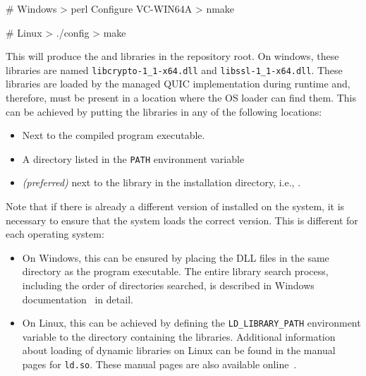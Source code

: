 \begin{myVerbatim}
# Windows
> perl Configure VC-WIN64A
> nmake

# Linux
> ./config
> make
\end{myVerbatim}

This will produce the  and  libraries in the \libopenssl{}
repository root. On windows, these libraries are named \texttt{libcrypto-1_1-x64.dll} and
\texttt{libssl-1_1-x64.dll}. These libraries are loaded by the managed QUIC implementation during
runtime and, therefore, must be present in a location where the OS loader can find them. This can be
achieved by putting the libraries in any of the following locations:

\begin{itemize}

  \item Next to the compiled program executable.

  \item A directory listed in the \texttt{PATH} environment variable

  \item \textit{(preferred)} next to the \SystemNetQuicDll{} library in the \dotnet{} installation
directory, i.e., .

\end{itemize}

Note that if there is already a different version of \libopenssl{} installed on the system, it is
necessary to ensure that the system loads the correct \libopenssl{} version. This is different for
each operating system:

\begin{itemize}

  \item On Windows, this can be ensured by placing the DLL files in the same directory as the
program executable. The entire library search process, including the order of directories searched,
is described in Windows documentation~\cite{windowsDllSearch} in detail.

  \item On Linux, this can be achieved by defining the \texttt{LD_LIBRARY_PATH} environment variable
to the directory containing the \libopenssl{} libraries. Additional information about loading of
dynamic libraries on Linux can be found in the manual pages for \texttt{ld.so}. These manual pages
are also available online~\cite{linuxDllSearch}.

\end{itemize}

